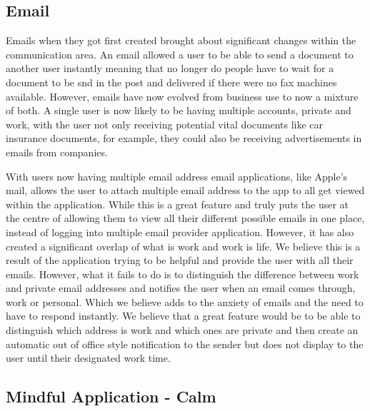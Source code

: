 \documentclass{sigchi}
\begin{document}
		\subsection{Email}
		Emails when they got first created brought about significant changes within the communication area. An email allowed a user to be able to send a document to another user instantly meaning that no longer do people have to wait for a document to be snd in the post and delivered if there were no fax machines available. However, emails have now evolved from business use to now a mixture of both. A single user is now likely to be having multiple accounts, private and work, with the user not only receiving potential vital documents like car insurance documents, for example, they could also be receiving advertisements in emails from companies.
		
		With users now having multiple email address email applications, like Apple's mail, allows the user to attach multiple email address to the app to all get viewed within the application. While this is a great feature and truly puts the user at the centre of allowing them to view all their different possible emails in one place, instead of logging into multiple email provider application. However, it has also created a significant overlap of what is work and work is life. We believe this is a result of the application trying to be helpful and provide the user with all their emails. However, what it fails to do is to distinguish the difference between work and private email addresses and notifies the user when an email comes through, work or personal. Which we believe adds to the anxiety of emails and the need to have to respond instantly.  We believe that a great feature would be to be able to distinguish which address is work and which ones are private and then create an automatic out of office style notification to the sender but does not display to the user until their designated work time.
		
		\subsection{Mindful Application - Calm}
		
\end{document}
